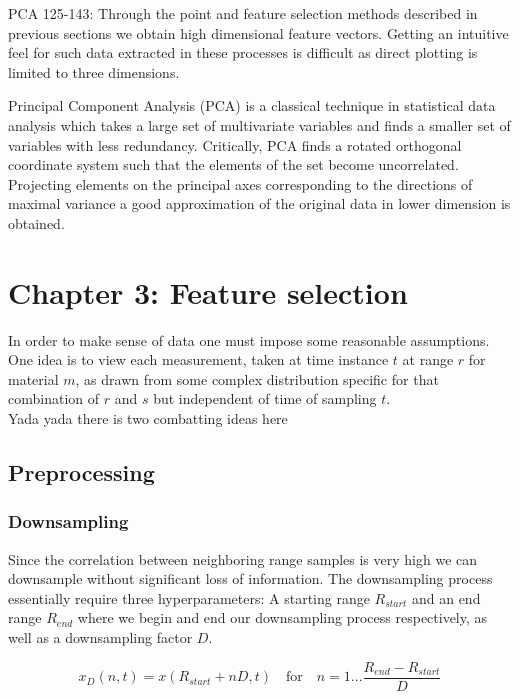\documentclass[a4paper, 12pt]{article}
\begin{document}
PCA 125-143: Through the point and feature selection methods described in previous sections we obtain high dimensional feature vectors. Getting an intuitive feel for such data extracted in these processes is difficult as direct plotting is limited to three dimensions. 

Principal Component Analysis (PCA) is  a classical technique in statistical data analysis which takes a large set of multivariate variables and finds a smaller set of variables with less redundancy. Critically, PCA finds a rotated orthogonal coordinate system such that the elements of the set become uncorrelated. Projecting elements on the principal axes corresponding to the directions of maximal variance a good approximation of the original data in lower dimension is obtained\citep{hyvasrinen_karhunen_oja_2004}. 

\section{Chapter 3: Feature selection}

In order to make sense of data one must impose some reasonable assumptions. 
\\ 
One idea is to view each measurement, taken at time instance $t$ at range $r$ for material $m$, as drawn from some 
complex distribution specific for that combination of $r$ and $s$ but independent of time of sampling $t$. 
\\
Yada yada there is two combatting ideas here

\subsection{Preprocessing}

\subsubsection{Downsampling}

Since the correlation between neighboring range samples is very high we can downsample without significant loss of information. The downsampling process essentially require three hyperparameters: A starting range $R_{start}$ and an end range $R_{end}$ where we begin and end our downsampling process respectively, as well as a downsampling factor $D$.

\begin{equation}
	x_D(n, t) = x(R_{start} + nD, t) \quad \text{for}\quad n=1...\frac{R_{end}-R_{start}}{D}
\end{equation}
\end{document}
